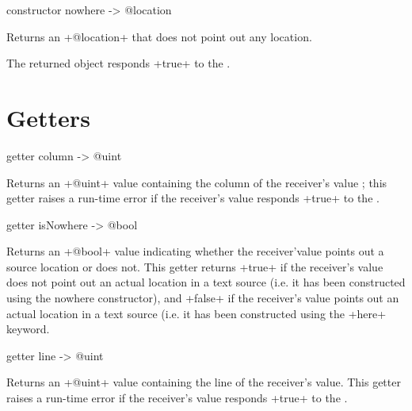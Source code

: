
\begin{galgas}
constructor nowhere -> @location
\end{galgas}


Returns an \ggs+@location+ that does not point out any location.

The returned object responds \ggs+true+ to the .





\section{Getters}



\begin{galgas}
getter column -> @uint
\end{galgas}

Returns an \ggs+@uint+ value containing the column of the receiver's value ; this getter raises a run-time error if the receiver's value responds \ggs+true+ to the .



\begin{galgas}
getter isNowhere -> @bool
\end{galgas}

Returns an \ggs+@bool+ value indicating whether the receiver'value points out a source location or does not. This getter returns \ggs+true+ if the receiver's value does not point out an actual location in a text source (i.e. it has been constructed using the nowhere constructor), and \ggs+false+ if the receiver's value points out an actual location in a text source (i.e. it has been constructed using the \ggs+here+ keyword.



\begin{galgas}
getter line -> @uint
\end{galgas}

Returns an \ggs+@uint+ value containing the line of the receiver's value. This getter raises a run-time error if the receiver's value responds \ggs+true+ to the .



